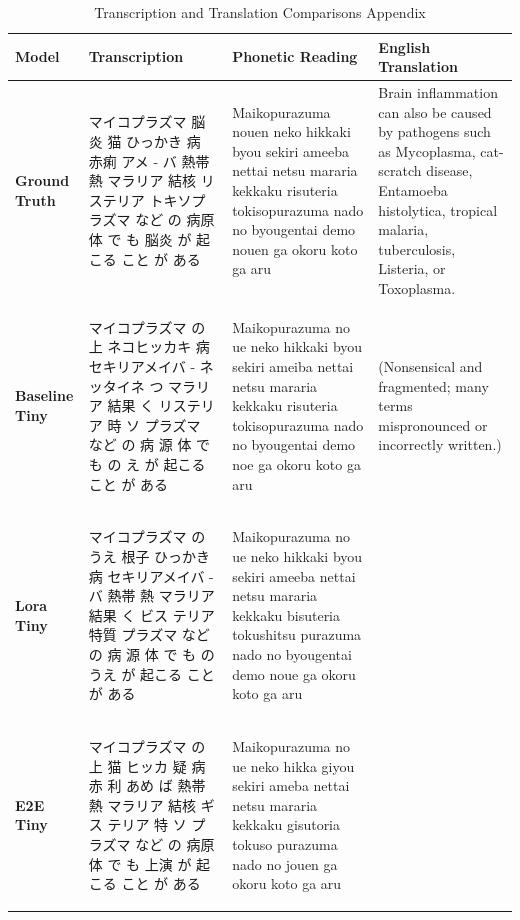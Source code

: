 \documentclass[10pt,twocolumn,letterpaper]{article}
\begin{document}
\begin{table}[H]
    \centering
    \caption{Transcription and Translation Comparisons Appendix}
    \label{tab:transcription_comparison_appendix}
    \renewcommand{\arraystretch}{1.3}
    \begin{adjustbox}{width=\textwidth}
    \begin{tabular}{p{2.5cm}p{5cm}p{5cm}p{4cm}}
        \toprule
        \textbf{Model} & \textbf{Transcription} & \textbf{Phonetic Reading} & \textbf{English Translation} \\
        \midrule
        \textbf{Ground Truth} & \begin{CJK*}{UTF8}{min}マイコプラズマ 脳炎 猫 ひっかき 病 赤痢 アメ - バ 熱帯 熱 マラリア 結核 リステリア トキソプラズマ など の 病原 体 で も 脳炎 が 起こる こと が ある\end{CJK*} & Maikopurazuma nouen neko hikkaki byou sekiri ameeba nettai netsu mararia kekkaku risuteria tokisopurazuma nado no byougentai demo nouen ga okoru koto ga aru & Brain inflammation can also be caused by pathogens such as Mycoplasma, cat-scratch disease, Entamoeba histolytica, tropical malaria, tuberculosis, Listeria, or Toxoplasma. \\
        \textbf{Baseline Tiny} & \begin{CJK*}{UTF8}{min}マイコプラズマ の 上 ネコヒッカキ 病 セキリアメイバ - ネッタイネ つ マラリア 結果 く リステリア 時 ソ プラズマ など の 病 源 体 で も の え が 起こる こと が ある\end{CJK*} & Maikopurazuma no ue neko hikkaki byou sekiri ameiba nettai netsu mararia kekkaku risuteria tokisopurazuma nado no byougentai demo noe ga okoru koto ga aru & (Nonsensical and fragmented; many terms mispronounced or incorrectly written.) \\
        \textbf{Lora Tiny} & \begin{CJK*}{UTF8}{min}マイコプラズマ の うえ 根子 ひっかき 病 セキリアメイバ - バ 熱帯 熱 マラリア 結果 く ビス テリア 特質 プラズマ など の 病 源 体 で も の うえ が 起こる こと が ある\end{CJK*} & Maikopurazuma no ue neko hikkaki byou sekiri ameeba nettai netsu mararia kekkaku bisuteria tokushitsu purazuma nado no byougentai demo noue ga okoru koto ga aru\\
        \textbf{E2E Tiny} & \begin{CJK*}{UTF8}{min}マイコプラズマ の 上 猫 ヒッカ 疑 病 赤 利 あめ ば 熱帯 熱 マラリア 結核 ギス テリア 特 ソ プラズマ など の 病原 体 で も 上演 が 起こる こと が ある\end{CJK*} & Maikopurazuma no ue neko hikka giyou sekiri ameba nettai netsu mararia kekkaku gisutoria tokuso purazuma nado no jouen ga okoru koto ga aru\\
        \bottomrule
    \end{tabular}
    \end{adjustbox}
\end{table}
\end{document}
